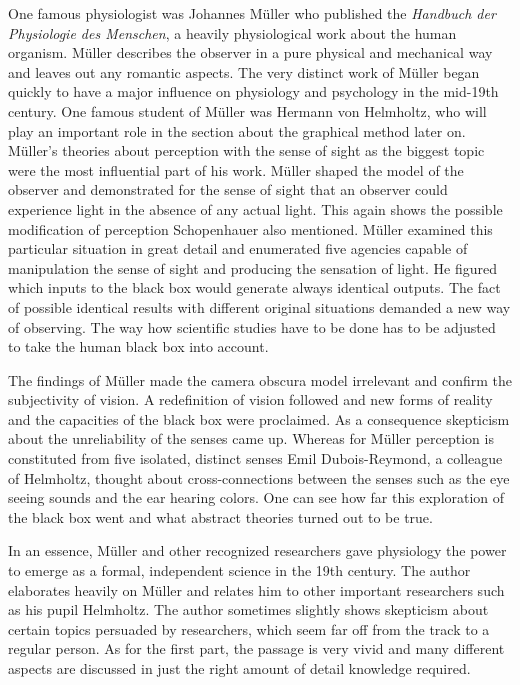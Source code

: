 \documentclass[12pt,a4paper]{article}
\begin{document}
One famous physiologist was Johannes Müller who published the {\it{Handbuch der Physiologie des Menschen}},
a heavily physiological work about the human organism. Müller describes the observer in a pure physical and
mechanical way and leaves out any romantic aspects. The very distinct work of Müller began quickly to have
a major influence on physiology and psychology in the mid-19th century. One famous student of Müller was
Hermann von Helmholtz, who will play an important role in the section about the graphical method later on.
Müller's theories about perception with the sense of sight as the biggest topic were the most influential
part of his work. Müller shaped the model of the observer and demonstrated for the sense of sight that
an observer could experience light in the absence of any actual light.
This again shows the possible modification of perception Schopenhauer also mentioned.
Müller examined this particular situation in great detail and enumerated five agencies capable of 
manipulation the sense of sight and producing the sensation of light.
He figured which inputs to the black box would generate always identical outputs.
The fact of possible identical results with different original situations demanded a new way of
observing. The way how scientific studies have to be done has to be adjusted to take the human
black box into account.

The findings of Müller made the camera obscura model irrelevant and confirm the subjectivity of vision.
A redefinition of vision followed and new forms of reality and the capacities of the black box were
proclaimed. As a consequence skepticism  about the unreliability of the senses came up.
Whereas for Müller perception is constituted from five isolated, distinct senses Emil Dubois-Reymond,
a colleague of Helmholtz, thought about cross-connections between the senses such as the eye seeing
sounds and the ear hearing colors. One can see how far this exploration of the black box went and
what abstract theories turned out to be true.

In an essence, Müller and other recognized researchers gave physiology the power to emerge as a
formal, independent science in the 19th century. The author elaborates heavily on Müller and relates him
to other important researchers such as his pupil Helmholtz. The author sometimes slightly shows
skepticism about certain topics persuaded by researchers, which seem far off from the track to a regular person.
As for the first part, the passage is very vivid and many different aspects are discussed in
just the right amount of detail knowledge required.
\end{document}

